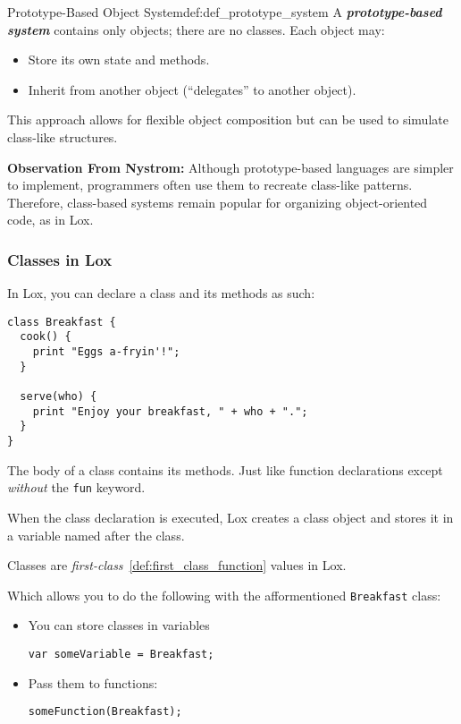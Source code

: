 \documentclass[12pt,a4paper]{article}
\newcommand{\newpar} {
  \vspace{1em}
  \noindent
}
\newcommand{\bemph}[1]{\textbf{\emph{#1}}}
\newcommand{\dq}[1]{``#1''}
\begin{document}
\begin{definition}{Prototype-Based Object System}{def:def_prototype_system}
	A \bemph{prototype-based system} contains only objects; there are no classes. Each object may:
	\begin{itemize}
		\item Store its own state and methods.
		\item Inherit from another object (\dq{delegates} to another object).
	\end{itemize}
	This approach allows for flexible object composition but can be used to simulate class-like structures.
\end{definition}

\newpar
\textbf{Observation From Nystrom:} Although prototype-based languages are simpler to implement, programmers often use them to recreate class-like patterns. Therefore, class-based systems remain popular for organizing object-oriented code, as in Lox.

\subsubsection*{Classes in Lox}

In Lox, you can declare a class and its methods as such:

\begin{lstlisting}
class Breakfast {
  cook() {
    print "Eggs a-fryin'!";
  }

  serve(who) {
    print "Enjoy your breakfast, " + who + ".";
  }
}
\end{lstlisting}

\newpar
The body of a class contains its methods.
Just like function declarations except \emph{without} the \texttt{fun} keyword.

\newpar
When the class declaration is executed, Lox creates a class object and stores it in a variable named after the class.


\newpar
Classes are \emph{first-class}~\ref{def:first_class_function} values in Lox.

Which allows you to do the following with the afformentioned \texttt{Breakfast} class:

\begin{itemize}

	\item You can store classes in variables

	      \begin{lstlisting}
var someVariable = Breakfast;
\end{lstlisting}

	\item Pass them to functions:

	      \begin{lstlisting}
someFunction(Breakfast);
\end{lstlisting}
\end{itemize}
\end{document}
